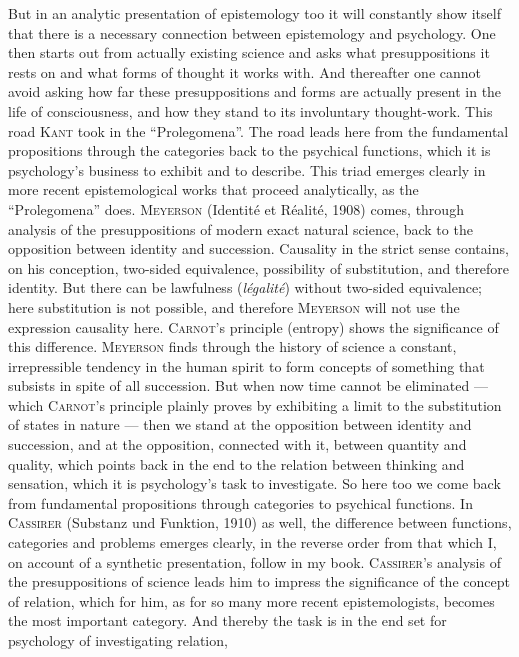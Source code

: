 \documentclass[12pt]{book}
\newcommand{\opage}[1]{\marginnote{\footnotesize\textit{[#1]}}}
\begin{document}
But in an analytic presentation of epistemology too it will constantly show
itself that there is a necessary connection between epistemology and psychology.
One then starts out from actually existing science and asks what presuppositions
it rests on and what forms of thought it works with. And thereafter one cannot
avoid asking how far these presuppositions and forms are actually present in the
life of consciousness, and how they stand to its involuntary thought-work. This
road \textsc{Kant} took in the ``Prolegomena''. The road leads here from the
fundamental propositions through the categories back to the psychical functions,
which it is psychology's business to exhibit and to describe. This triad emerges
clearly in more recent epistemological works that proceed analytically, as the
``Prolegomena'' does. \textsc{Meyerson} (Identité et Réalité, 1908) comes,
through analysis of the presuppositions of modern exact natural science, back to
the opposition between identity and succession. Causality in the strict sense
contains, on his conception, two-sided equivalence, possibility of substitution,
and therefore identity. But there can be lawfulness (\textit{légalité}) without
two-sided equivalence; here substitution is not possible, and therefore
\textsc{Meyerson} will not use the expression causality here.
\textsc{Carnot}'s principle (entropy) shows the significance of this difference.
\textsc{Meyerson} finds through the history of science a constant, irrepressible
tendency in the human spirit to form concepts of something that subsists in
spite of all succession. But when now time cannot be eliminated --- which
\textsc{Carnot}'s principle plainly proves by exhibiting a limit to the
substitution of states in nature --- then we stand at the opposition between
identity and succession, and at the opposition, connected with it, between
quantity and quality, which points back in the end to the relation between
thinking and sensation, which it is psychology's task to investigate. So here
too we come back from fundamental propositions through categories to psychical
functions. In \textsc{Cassirer} (Substanz und Funktion, 1910) as well, the
difference between functions, categories and problems emerges clearly, in the
reverse order from that which I, on account of a synthetic presentation, follow
in my book. \textsc{Cassirer}'s analysis of the presuppositions of science leads
him to impress the significance of the concept of relation, which for him, as
\opage{15}for so many more recent epistemologists, becomes the most important category.
And thereby the task is in the end set for psychology of investigating relation,
\end{document}
